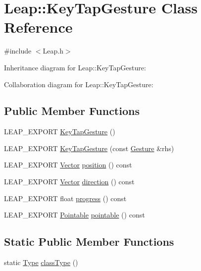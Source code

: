 \hypertarget{class_leap_1_1_key_tap_gesture}{}\section{Leap\+:\+:Key\+Tap\+Gesture Class Reference}
\label{class_leap_1_1_key_tap_gesture}


{\ttfamily \#include $<$Leap.\+h$>$}



Inheritance diagram for Leap\+:\+:Key\+Tap\+Gesture\+:


Collaboration diagram for Leap\+:\+:Key\+Tap\+Gesture\+:
\subsection*{Public Member Functions}
\begin{DoxyCompactItemize}
\item 
L\+E\+A\+P\+\_\+\+E\+X\+P\+O\+RT \hyperlink{class_leap_1_1_key_tap_gesture_a916eb2060586a29c499b0201cef9b203}{Key\+Tap\+Gesture} ()
\item 
L\+E\+A\+P\+\_\+\+E\+X\+P\+O\+RT \hyperlink{class_leap_1_1_key_tap_gesture_a701172268caa05b6c05bf3cd8578bde5}{Key\+Tap\+Gesture} (const \hyperlink{class_leap_1_1_gesture}{Gesture} \&rhs)
\item 
L\+E\+A\+P\+\_\+\+E\+X\+P\+O\+RT \hyperlink{struct_leap_1_1_vector}{Vector} \hyperlink{class_leap_1_1_key_tap_gesture_ac69928f2af458cc3d275bf3c0deea11c}{position} () const
\item 
L\+E\+A\+P\+\_\+\+E\+X\+P\+O\+RT \hyperlink{struct_leap_1_1_vector}{Vector} \hyperlink{class_leap_1_1_key_tap_gesture_aa85b81080efc56e05ae35f852ab6794e}{direction} () const
\item 
L\+E\+A\+P\+\_\+\+E\+X\+P\+O\+RT float \hyperlink{class_leap_1_1_key_tap_gesture_a3df8d13a9b67a25886f41b8a674d30de}{progress} () const
\item 
L\+E\+A\+P\+\_\+\+E\+X\+P\+O\+RT \hyperlink{class_leap_1_1_pointable}{Pointable} \hyperlink{class_leap_1_1_key_tap_gesture_a74aae63f639ac529969bc2b3a9a8bbc7}{pointable} () const
\end{DoxyCompactItemize}
\subsection*{Static Public Member Functions}
\begin{DoxyCompactItemize}
\item 
static \hyperlink{class_leap_1_1_gesture_a6fa6dd4f28c502f0d55abc6b71c6f9b1}{Type} \hyperlink{class_leap_1_1_key_tap_gesture_a674173890d1f8b1b2d2cee98245b65f2}{class\+Type} ()
\end{DoxyCompactItemize}
